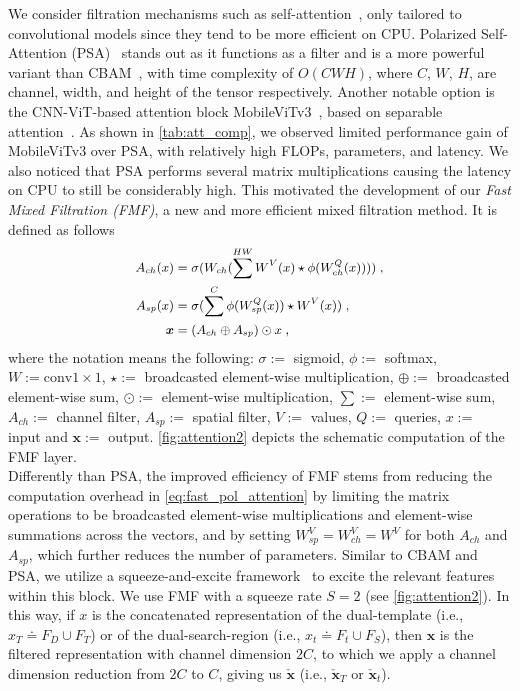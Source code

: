 We consider filtration mechanisms such as self-attention~\cite{vaswani2017attention}, only tailored to convolutional models since they tend to be more efficient on CPU. Polarized Self-Attention (PSA)~\cite{liu2021polarized} stands out as it functions as a filter and is a more powerful variant than CBAM~\cite{woo2018cbam}, with time complexity of $O(CWH)$, where $C$, $W$, $H$, are channel, width, and height of the tensor respectively. Another notable option is the CNN-ViT-based attention block MobileViTv3~\cite{wadekar2022mobilevitv3}, based on separable attention~\cite{mehta2022separable}. As shown in \ref{tab:att_comp}, we observed limited performance gain of MobileViTv3 over PSA, with relatively high FLOPs, parameters, and latency. We also noticed that PSA performs several matrix multiplications causing the latency on CPU to still be considerably high. This motivated the development of our \emph{Fast Mixed Filtration (FMF)}, a new and more efficient mixed filtration method. It is defined as follows
\begin{equation}\small
  \centering
  \label{eq:fast_pol_attention}
      \begin{aligned}   
          A_{ch}(x) &= \sigma(W_{ch}(\sum^{HW} W^V(x) \star \phi(W^Q_{ch}(x))  )) \; , \\ %
          A_{sp}(x) &= \sigma(\sum^{C} \phi(W^Q_{sp}(x)) \star W^V(x))\; ,\\ %
          \boldsymbol{x} &= (A_{ch} \oplus  A_{sp}) \odot x \; , \\
\end{aligned}
\end{equation}
where the notation means the following: $\sigma :=$ sigmoid, $\phi :=$ softmax, $W := \mathrm{conv}1 \times 1$,  $\star :=$ broadcasted element-wise multiplication, $\oplus :=$ broadcasted element-wise sum, $\odot :=$ element-wise multiplication, $\sum :=$ element-wise sum, $A_{ch} :=$ channel filter, $A_{sp} :=$ spatial filter, $V:=$ values, $Q:=$ queries, $x :=$ input  and $\boldsymbol{x} :=$ output. \ref{fig:attention2} depicts the schematic computation of the FMF layer.\\

Differently than PSA, the improved efficiency of FMF stems from reducing the computation overhead in \ref{eq:fast_pol_attention} by limiting the matrix operations to be broadcasted element-wise multiplications and element-wise summations across the vectors, and by setting $W^V_{sp}=W^V_{ch}=W^V$ for both $A_{ch}$ and $A_{sp}$, which further reduces the number of parameters. Similar to CBAM and PSA, we utilize a squeeze-and-excite framework~\cite{iandola2016squeezenet} to excite the relevant features within this block. We use FMF with a squeeze rate $S=2$ (see \ref{fig:attention2}). In this way, if $x$ is the concatenated representation of the dual-template (i.e., $x_T \doteq F_D \cup F_T$) or of the dual-search-region (i.e., $x_t \doteq F_t \cup F_S$), then $\boldsymbol{x}$ is the filtered representation with channel dimension $2C$, to which we apply a channel dimension reduction from $2C$ to $C$, giving us $\boldsymbol{\check{x}}$ (i.e., $\boldsymbol{\check{x}}_T$ or $\boldsymbol{\check{x}}_t$). \\

